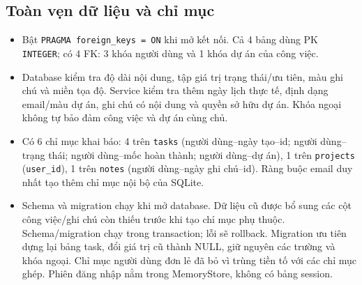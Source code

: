 \subsection{Toàn vẹn dữ liệu và chỉ mục}
\begin{itemize}
  \item Bật \texttt{PRAGMA foreign\_keys = ON} khi mở kết nối.
  Cả 4 bảng dùng PK \texttt{INTEGER}; có 4 FK: 3 khóa người dùng
  và 1 khóa dự án của công việc.
  \item Database kiểm tra độ dài nội dung, tập giá trị trạng thái/ưu tiên,
  màu ghi chú và miền tọa độ. Service kiểm tra thêm ngày lịch thực tế,
  định dạng email/màu dự án, ghi chú có nội dung và quyền sở hữu dự án.
  Khóa ngoại không tự bảo đảm công việc và dự án cùng chủ.
  \item Có 6 chỉ mục khai báo: 4 trên \texttt{tasks}
  (người dùng--ngày tạo--id; người dùng--trạng thái; người dùng--mốc hoàn thành;
  người dùng--dự án), 1 trên \texttt{projects} (\texttt{user\_id}),
  1 trên \texttt{notes} (người dùng--ngày ghi chú--id).
  Ràng buộc email duy nhất tạo thêm chỉ mục nội bộ của SQLite.
  \item Schema và migration chạy khi mở database. Dữ liệu cũ được bổ sung
  các cột công việc/ghi chú còn thiếu trước khi tạo chỉ mục phụ thuộc.
  Schema/migration chạy trong transaction; lỗi sẽ rollback.
  Migration ưu tiên dựng lại bảng task, đổi giá trị cũ thành NULL, giữ nguyên các trường và khóa ngoại.
  Chỉ mục người dùng đơn lẻ đã bỏ vì trùng tiền tố với các chỉ mục ghép.
  Phiên đăng nhập nằm trong MemoryStore, không có bảng session.
\end{itemize}
